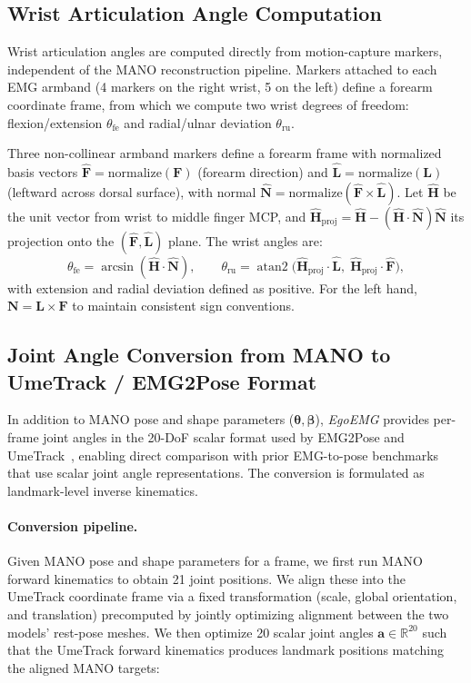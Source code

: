 \documentclass[letterpaper]{article} %
\newcommand{\dataset}{\textit{EgoEMG}}
\begin{document}
\subsection{Wrist Articulation Angle Computation}
\label{app:wrist_angles}

Wrist articulation angles are computed directly from motion-capture markers,
independent of the MANO reconstruction pipeline. Markers attached to each EMG
armband (4 markers on the right wrist, 5 on the left) define a forearm
coordinate frame, from which we compute two wrist degrees of freedom:
flexion/extension $\theta_{\text{fe}}$ and radial/ulnar deviation
$\theta_{\text{ru}}$.

Three non-collinear armband markers define a forearm frame with normalized basis vectors
$\hat{\mathbf{F}} = \mathrm{normalize}(\mathbf{F})$ (forearm direction) and $\hat{\mathbf{L}} = \mathrm{normalize}(\mathbf{L})$ (leftward across dorsal
surface), with normal $\hat{\mathbf{N}} = \mathrm{normalize}(\hat{\mathbf{F}} \times
\hat{\mathbf{L}})$. Let $\hat{\mathbf{H}}$ be the unit vector from wrist to middle
finger MCP, and $\hat{\mathbf{H}}_{\text{proj}} = \hat{\mathbf{H}} - (\hat{\mathbf{H}} \cdot \hat{\mathbf{N}})\hat{\mathbf{N}}$ its projection onto the
$(\hat{\mathbf{F}},\hat{\mathbf{L}})$ plane. The wrist angles are:
\[
\theta_{\text{fe}} = \arcsin(\hat{\mathbf{H}} \cdot \hat{\mathbf{N}}), \qquad
\theta_{\text{ru}} = \operatorname{atan2}\bigl(\hat{\mathbf{H}}_{\text{proj}}
\cdot \hat{\mathbf{L}},\; \hat{\mathbf{H}}_{\text{proj}} \cdot
\hat{\mathbf{F}}\bigr),
\]
with extension and radial deviation defined as positive. For the left hand,
$\mathbf{N} = \mathbf{L} \times \mathbf{F}$ to maintain consistent sign
conventions.

\subsection{Joint Angle Conversion from MANO to UmeTrack / EMG2Pose Format}
\label{app:joint_angle_conversion}

In addition to MANO pose and shape parameters
($\boldsymbol{\theta},\boldsymbol{\beta}$), \dataset{} provides per-frame joint
angles in the 20-DoF scalar format used by EMG2Pose and
UmeTrack~\citep{emg2pose, umetrack}, enabling direct comparison with prior
EMG-to-pose benchmarks that use scalar joint angle representations. The
conversion is formulated as landmark-level inverse kinematics.

\paragraph{Conversion pipeline.}
Given MANO pose and shape parameters for a frame, we first run MANO forward kinematics to obtain 21 joint positions. We align these into the UmeTrack coordinate frame via a fixed transformation (scale, global orientation, and translation) precomputed by jointly optimizing alignment between the two models' rest-pose meshes. We then optimize 20 scalar joint angles $\mathbf{a} \in \mathbb{R}^{20}$ such that the UmeTrack forward kinematics produces landmark positions matching the aligned MANO targets:
\end{document}
